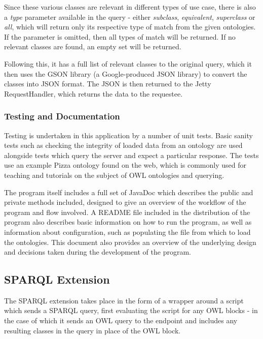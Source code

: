 \documentclass{article}
\begin{document}
Since these various classes are relevant in different types of use case, there
is also a \emph{type} parameter available in the query - either \emph{subclass},
\emph{equivalent}, \emph{superclass} or \emph{all}, which will return only its
respective type of match from the given ontologies. If the parameter is omitted,
then all types of match will be returned. If no relevant classes are found, an
empty set will be returned.

Following this, it has a full list of relevant classes to the original query,
which it then uses the GSON library\cite{gson} (a Google-produced JSON library) to convert 
the classes into JSON format. The JSON is then returned to the Jetty
RequestHandler, which returns the data to the requestee.

\subsubsection{Testing and Documentation}

Testing is undertaken in this application by a number of unit tests. Basic
sanity tests such as checking the integrity of loaded data from an ontology are
used alongside tests which query the server and expect a particular response.
The tests use an example Pizza ontology found on the web, which is commonly
used for teaching and tutorials on the subject of OWL ontologies and querying.

The program itself includes a full set of JavaDoc which describes the public and
private methods included, designed to give an overview of the workflow of the
program and flow involved. A README file included in the distribution of the
program also describes basic information on how to run the program, as well as
information about configuration, such as populating the file from which to load
the ontologies. This document also provides an overview of the underlying design
and decisions taken during the development of the program. 

\subsection{SPARQL Extension}

The SPARQL extension takes place in the form of a wrapper around a script which
sends a SPARQL query, first evaluating the script for any OWL blocks - in the
case of which it sends an OWL query to the endpoint and includes any resulting
classes in the query in place of the OWL block.
\end{document}
